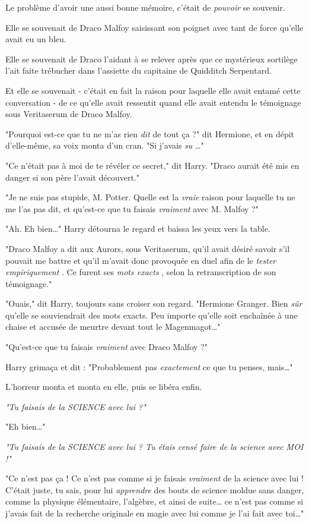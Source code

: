 Le problème d'avoir une aussi bonne mémoire, c'était de \emph{pouvoir}  se souvenir.

Elle se souvenait de Draco Malfoy saisissant son poignet avec tant de force qu'elle avait eu un bleu.

Elle se souvenait de Draco l'aidant à se relever après que ce mystérieux sortilège l'ait faite trébucher dans l'assiette du capitaine de Quidditch Serpentard.

Et elle se souvenait - c'était en fait la raison pour laquelle elle avait entamé cette conversation - de ce qu'elle avait ressentit quand elle avait entendu le témoignage sous Veritaserum de Draco Malfoy.

"Pourquoi est-ce que tu ne m'as rien \emph{dit}  de tout ça ?" dit Hermione, et en dépit d'elle-même, sa voix monta d'un cran. "Si j'avais \emph{su} …"

"Ce n'était pas à moi de te révéler ce secret," dit Harry. "Draco aurait été mis en danger si son père l'avait découvert."

"Je ne suis pas stupide, M. Potter. Quelle est la \emph{vraie}  raison pour laquelle tu ne me l'as pas dit, et qu'est-ce que tu faisais \emph{vraiment}  avec M. Malfoy ?"

"Ah. Eh bien…" Harry détourna le regard et baissa les yeux vers la table.

"Draco Malfoy a dit aux Aurors, sous Veritaserum, qu'il avait désiré savoir s'il pouvait me battre et qu'il m'avait donc provoquée en duel afin de le \emph{tester empiriquement} . Ce furent ses \emph{mots exacts} , selon la retranscription de son témoignage."

"Ouais," dit Harry, toujours sans croiser son regard. "Hermione Granger. Bien \emph{sûr}  qu'elle se souviendrait des mots exacts. Peu importe qu'elle soit enchaînée à une chaise et accusée de meurtre devant tout le Magenmagot…"

"Qu'est-ce que tu faisais \emph{vraiment}  avec Draco Malfoy ?"

Harry grimaça et dit : "Probablement pas \emph{exactement}  ce que tu penses, mais…"

L'horreur monta et monta en elle, puis se libéra enfin.

\emph{"Tu faisais de la SCIENCE avec lui ?"} 

"Eh bien…"

\emph{"Tu faisais de la SCIENCE avec lui ? Tu étais censé faire de la science avec MOI !"} 

"Ce n'est pas ça ! Ce n'est pas comme si je faisais \emph{vraiment}  de la science avec lui ! C'était juste, tu sais, pour lui \emph{apprendre}  des bouts de science moldue sans danger, comme la physique élémentaire, l'algèbre, et ainsi de suite… ce n'est pas comme si j'avais fait de la recherche originale en magie avec lui comme je l'ai fait avec toi…"

